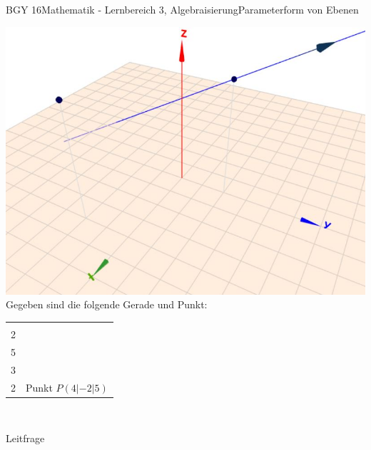 \documentclass[oneside,openany,headings=optiontotoc,11pt,numbers=noenddot]{scrreprt}
\begin{document}
	\begin{worksheet}{BGY 16}{Mathematik - Lernbereich 3, Algebraisierung}{Parameterform von Ebenen}
		
		\begin{framed}
			\includegraphics[scale=1.05]{Bilder/geradePunkt.jpg}\\
			Gegeben sind die folgende Gerade und Punkt:\\
			\begin{tabularx}{\textwidth}{XX}
				\(g: \vec{x} = \left(\begin{array}{c}0\\2\\5\end{array}\right) + r\left(\begin{array}{c}1\\3\\2\end{array}\right)\) & Punkt \(P(4|-2|5)\)\\
			\end{tabularx}\\
			\par\noindent
		\end{framed}
		\begin{framed}
			\tiny{\color{codegray}Leitfrage}\\
			\par\bigskip\noindent
		\end{framed}
		\begin{framed}

\end{framed}
\end{worksheet}
\end{document}
